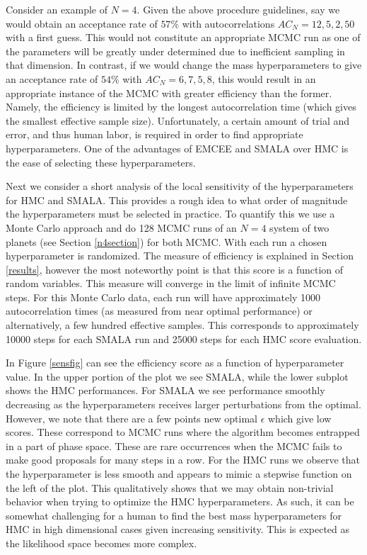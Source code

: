 \documentclass{aa}
\begin{document}
Consider an example of $N=4$. 
Given the above procedure guidelines, say we would obtain an acceptance rate of $57\%$ with autocorrelations $AC_N = 12, 5, 2, 50$ with a first guess.
This would not constitute an appropriate MCMC run as one of the parameters will be greatly under determined due to inefficient sampling in that dimension. 
In contrast, if we would change the mass hyperparameters to give an acceptance rate of $54\%$ with $AC_N = 6, 7, 5, 8$, this would result in an appropriate instance of the MCMC with greater efficiency than the former. 
Namely, the efficiency is limited by the longest autocorrelation time (which gives the smallest effective sample size). 
Unfortunately, a certain amount of trial and error, and thus human labor, is required in order to find appropriate hyperparameters. 
One of the advantages of EMCEE and SMALA over HMC is the ease of selecting these hyperparameters.

Next we consider a short analysis of the local sensitivity of the hyperparameters for HMC and SMALA. 
This provides a rough idea to what order of magnitude the hyperparameters must be selected in practice. 
To quantify this we use a Monte Carlo approach and do 128 MCMC runs of an $N=4$ system of two planets (see Section \ref{n4section}) for both MCMC.
With each run a chosen hyperparameter is randomized. The measure of efficiency is explained in Section \ref{results}, however the most noteworthy point is that this score is a function of random variables. 
This measure will converge in the limit of infinite MCMC steps. 
For this Monte Carlo data, each run will have approximately 1000 autocorrelation times (as measured from near optimal performance) or alternatively, a few hundred effective samples. 
This corresponds to approximately 10000 steps for each SMALA run and 25000 steps for each HMC score evaluation. 

In Figure \ref{sensfig} can see the efficiency score as a function of hyperparameter value. 
In the upper portion of the plot we see SMALA, while the lower subplot shows the HMC performances. For SMALA we see performance smoothly decreasing as the hyperparameters receives larger perturbations from the optimal. 
However, we note that there are a few points new optimal $\epsilon$ which give low scores. 
These correspond to MCMC runs where the algorithm becomes entrapped in a part of phase space. 
These are rare occurrences when the MCMC fails to make good proposals for many steps in a row. 
For the HMC runs we observe that the hyperparameter is less smooth and appears to mimic a stepwise function on the left of the plot. 
This qualitatively shows that we may obtain non-trivial behavior when trying to optimize the HMC hyperparameters. 
As such, it can be somewhat challenging for a human to find the best mass hyperparameters for HMC in high dimensional cases given increasing sensitivity. 
This is expected as the likelihood space becomes more complex.
\end{document}
